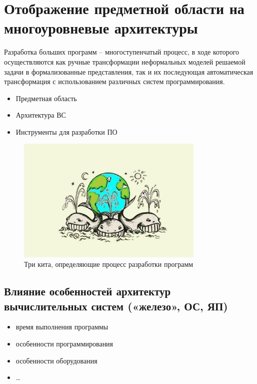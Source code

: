 
\chapter{Отображение предметной области на многоуровневые архитектуры}

Разработка больших программ – многоступенчатый процесс, в ходе которого осуществляются как ручные трансформации неформальных моделей решаемой задачи в формализованные представления, так и их последующая автоматическая трансформация с использованием различных систем программирования.

\begin{itemize}
    \item Предметная область
    \item Архитектура ВС
    \item Инструменты для разработки ПО
\end{itemize}

\begin{figure}[htbp]
    \centering
    \includegraphics[width=0.8\textwidth]{img/reflection-02.png}
    \caption{Три кита, определяющие процесс разработки программ}
    \label{reflection-02}
\end{figure}

\section{Влияние особенностей архитектур вычислительных систем («железо», ОС, ЯП)}

\begin{itemize}
    \item время выполнения программы
    \item особенности программирования
    \item особенности оборудования
    \item …
\end{itemize}

